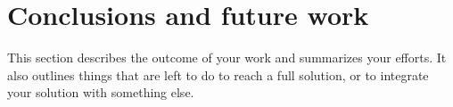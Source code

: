 \section{Conclusions and future work}
This section describes the outcome of your work and summarizes your efforts. It also outlines things that are left to do to reach a full solution, or to integrate your solution with something else.